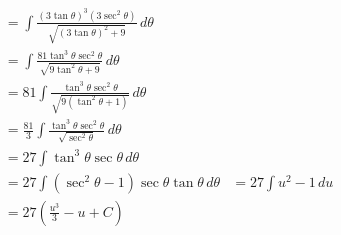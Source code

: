 \documentclass[preview]{standalone}
\begin{document}
\begin{align*}
&= \int \frac{(3\tan\theta)^3(3\sec^2\theta)}{\sqrt{(3\tan\theta)^2+9}} \, d\theta \\ &= \int \frac{81\tan^3\theta\sec^2\theta}{\sqrt{9\tan^2\theta+9}} \, d\theta \\ &= 81\int \frac{\tan^3\theta\sec^2\theta}{\sqrt{9(\tan^2\theta+1)}} \, d\theta \\ &= \frac{81}{3}\int \frac{\tan^3\theta\sec^2\theta}{\sqrt{\sec^2\theta}} \, d\theta \\ &= 27\int \tan^3\theta\sec\theta \, d\theta \\ &= 27\int (\sec^2\theta-1)\sec\theta\tan\theta \, d\theta &=27\int u^2-1 \, du \\ &=27(\frac{u^3}{3}-u+C)
\end{align*}
\end{document}
